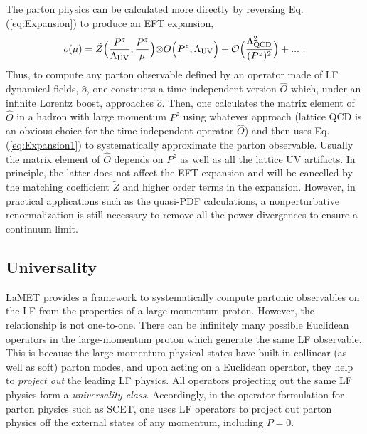 The parton physics can be calculated more directly by reversing
Eq. (\ref{eq:Expansion}) to produce an EFT expansion,
\begin{align}
	o(\mu)= \tilde Z\Big({P^z\over\Lambda_{\rm UV}},
	{P^z\over \mu}\Big){\otimes} O\Big(P^z,\Lambda_{\rm UV}\Big) + {\cal O}\Big({\Lambda_{\rm QCD}^2\over (P^z)^2}\Big)+ ... \ .
	\label{eq:Expansion1}
\end{align}
Thus, to compute any parton observable defined by an operator made of LF dynamical fields, $\hat o$, one constructs a time-independent version $\hat O$ which, under an infinite
Lorentz boost, approaches $\hat o$. Then, one calculates the matrix element
of $\hat O$ in a hadron with large momentum $P^z$ using
whatever approach (lattice QCD is an obvious choice for the time-independent operator $\hat O$)
and then uses Eq. (\ref{eq:Expansion1}) to systematically approximate the parton {observable}.
Usually the matrix element of $\hat O$ depends on $P^z$ as well as all the lattice UV artifacts.
In principle, the latter does not affect the EFT expansion and will be cancelled by the matching coefficient $\tilde Z$ and higher order terms in the expansion. However,
in practical applications such as the quasi-PDF calculations, a nonperturbative renormalization is still necessary to remove all the power divergences to ensure a continuum limit.

\subsection{Universality}
\label{sec:lamet-univ}
LaMET provides a framework to systematically
compute partonic observables on the LF from the properties of
a large-momentum proton.
However, the relationship is not one-to-one. There can be
infinitely many possible Euclidean operators in the large-momentum proton
which generate the same LF observable. This is because
the large-momentum physical states have built-in
collinear (as well as soft) parton modes, and upon acting on
a Euclidean operator, they help to {\it project out}
the leading LF physics. All operators projecting out
the same LF physics form a {\it universality class}.
Accordingly, in the operator formulation
for parton physics such as SCET, one uses
LF operators to project out parton physics off the external
states of any momentum, including $P=0$.

